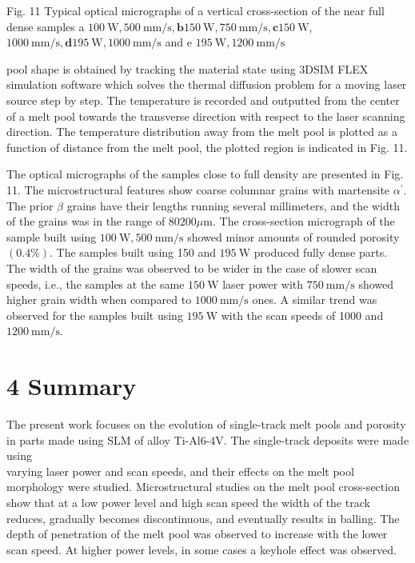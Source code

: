 \documentclass[10pt]{article}
\begin{document}
Fig. 11 Typical optical micrographs of a vertical cross-section of the near full dense samples a $100 \mathrm{~W}, 500 \mathrm{~mm} / \mathrm{s}, \mathbf{b} 150 \mathrm{~W}, 750 \mathrm{~mm} / \mathrm{s}, \mathbf{c} 150 \mathrm{~W}$, $1000 \mathrm{~mm} / \mathrm{s}, \mathbf{d} 195 \mathrm{~W}, 1000 \mathrm{~mm} / \mathrm{s}$ and e $195 \mathrm{~W}, 1200 \mathrm{~mm} / \mathrm{s}$

pool shape is obtained by tracking the material state using 3DSIM FLEX simulation software which solves the thermal diffusion problem for a moving laser source step by step. The temperature is recorded and outputted from the center of a melt pool towards the transverse direction with respect to the laser scanning direction. The temperature distribution away from the melt pool is plotted as a function of distance from the melt pool, the plotted region is indicated in Fig. 11.

The optical micrographs of the samples close to full density are presented in Fig. 11. The microstructural features show coarse columnar grains with martensite $\alpha^{\prime}$. The prior $\beta$ grains have their lengths running several millimeters, and the width of the grains was in the range of 80$200 \mu \mathrm{m}$. The cross-section micrograph of the sample built using $100 \mathrm{~W}, 500 \mathrm{~mm} / \mathrm{s}$ showed minor amounts of rounded porosity $(0.4 \%)$. The samples built using 150 and $195 \mathrm{~W}$ produced fully dense parts. The width of the grains was observed to be wider in the case of slower scan speeds, i.e., the samples at the same $150 \mathrm{~W}$ laser power with $750 \mathrm{~mm} / \mathrm{s}$ showed higher grain width when compared to $1000 \mathrm{~mm} / \mathrm{s}$ ones. A similar trend was observed for the samples built using $195 \mathrm{~W}$ with the scan speeds of 1000 and $1200 \mathrm{~mm} / \mathrm{s}$.

\section*{4 Summary}
The present work focuses on the evolution of single-track melt pools and porosity in parts made using SLM of alloy Ti-Al6-4V. The single-track deposits were made using\\
varying laser power and scan speeds, and their effects on the melt pool morphology were studied. Microstructural studies on the melt pool cross-section show that at a low power level and high scan speed the width of the track reduces, gradually becomes discontinuous, and eventually results in balling. The depth of penetration of the melt pool was observed to increase with the lower scan speed. At higher power levels, in some cases a keyhole effect was observed.
\end{document}
